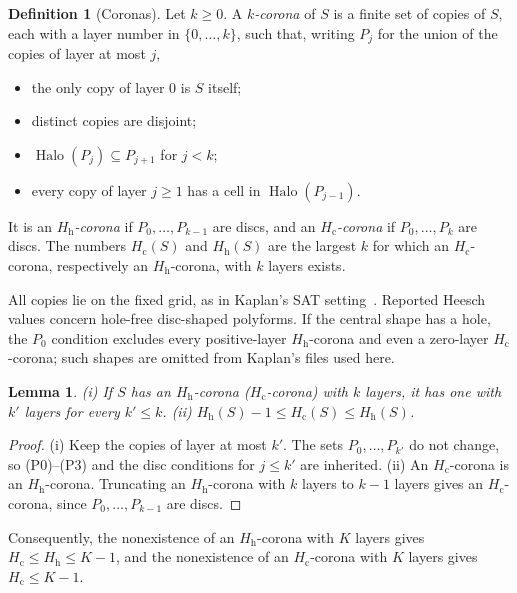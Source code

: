 \documentclass[10pt,a4paper]{article}
\newtheorem{lemma}[theorem]{Lemma}
\theoremstyle{definition}
\newtheorem{definition}[theorem]{Definition}
\theoremstyle{remark}
\newcommand{\Halo}{\operatorname{Halo}}
\newcommand{\Hc}{H_{\mathrm c}}
\newcommand{\Hh}{H_{\mathrm h}}
\begin{document}
\begin{samepage}
\begin{definition}[Coronas]
\label{def:corona}
Let $k\geq0$. A \emph{$k$-corona} of $S$ is a finite set of copies of $S$,
each with a layer number in $\{0,\dots,k\}$, such that, writing $P_j$ for
the union of the copies of layer at most $j$,
\begin{itemize}
\item[(P0)] the only copy of layer $0$ is $S$ itself;
\item[(P1)] distinct copies are disjoint;
\item[(P2)] $\Halo(P_j)\subseteq P_{j+1}$ for $j<k$;
\item[(P3)] every copy of layer $j\geq1$ has a cell in $\Halo(P_{j-1})$.
\end{itemize}
It is an \emph{$\Hh$-corona} if $P_0,\dots,P_{k-1}$ are discs, and an
\emph{$\Hc$-corona} if $P_0,\dots,P_k$ are discs. The numbers $\Hc(S)$ and
$\Hh(S)$ are the largest $k$ for which an $\Hc$-corona, respectively an
$\Hh$-corona, with $k$ layers exists.
\end{definition}
\end{samepage}

All copies lie on the fixed grid, as in Kaplan's SAT
setting~\cite[Section~3]{Kaplan}. Reported Heesch values concern
hole-free disc-shaped polyforms. If the central shape has a hole, the
$P_0$ condition excludes every positive-layer $\Hh$-corona and even a
zero-layer $\Hc$-corona; such shapes are omitted from Kaplan's files used
here.

\begin{lemma}
\label{lem:trunc}
\textup{(i)} If $S$ has an $\Hh$-corona \textup{(}$\Hc$-corona\textup{)}
with $k$ layers, it has one with $k'$ layers for every $k'\leq k$.
\textup{(ii)} $\Hh(S)-1\leq\Hc(S)\leq\Hh(S)$.
\end{lemma}
\begin{proof}
(i) Keep the copies of layer at most $k'$. The sets $P_0,\dots,P_{k'}$ do
not change, so (P0)--(P3) and the disc conditions for $j\leq k'$ are
inherited. (ii) An $\Hc$-corona is an $\Hh$-corona. Truncating an
$\Hh$-corona with $k$ layers to $k-1$ layers gives an $\Hc$-corona, since
$P_0,\dots,P_{k-1}$ are discs.
\end{proof}

Consequently, the nonexistence of an $\Hh$-corona with $K$ layers gives
$\Hc\leq\Hh\leq K-1$, and the nonexistence of an $\Hc$-corona with $K$
layers gives $\Hc\leq K-1$.
\end{document}
